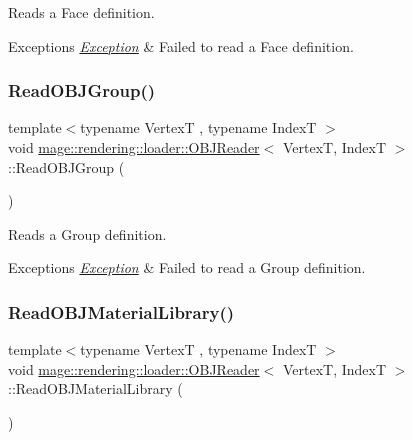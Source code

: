 Reads a Face definition.


\begin{DoxyExceptions}{Exceptions}
{\em \mbox{\hyperlink{classmage_1_1_exception}{Exception}}} & Failed to read a Face definition. \\
\hline
\end{DoxyExceptions}
\mbox{\label{classmage_1_1rendering_1_1loader_1_1_o_b_j_reader_a4e733a0afea4b82e3aea89fe58f5bfba}} 
\subsubsection{\texorpdfstring{Read\+O\+B\+J\+Group()}{ReadOBJGroup()}}
{\footnotesize\ttfamily template$<$typename VertexT , typename IndexT $>$ \\
void \mbox{\hyperlink{classmage_1_1rendering_1_1loader_1_1_o_b_j_reader}{mage\+::rendering\+::loader\+::\+O\+B\+J\+Reader}}$<$ VertexT, IndexT $>$\+::Read\+O\+B\+J\+Group (\begin{DoxyParamCaption}{ }\end{DoxyParamCaption})\hspace{0.3cm}{\ttfamily [private]}}

Reads a Group definition.


\begin{DoxyExceptions}{Exceptions}
{\em \mbox{\hyperlink{classmage_1_1_exception}{Exception}}} & Failed to read a Group definition. \\
\hline
\end{DoxyExceptions}
\mbox{\label{classmage_1_1rendering_1_1loader_1_1_o_b_j_reader_aa898eb5cac6a5e04b1da9329587a81cd}} 
\subsubsection{\texorpdfstring{Read\+O\+B\+J\+Material\+Library()}{ReadOBJMaterialLibrary()}}
{\footnotesize\ttfamily template$<$typename VertexT , typename IndexT $>$ \\
void \mbox{\hyperlink{classmage_1_1rendering_1_1loader_1_1_o_b_j_reader}{mage\+::rendering\+::loader\+::\+O\+B\+J\+Reader}}$<$ VertexT, IndexT $>$\+::Read\+O\+B\+J\+Material\+Library (\begin{DoxyParamCaption}{ }\end{DoxyParamCaption})\hspace{0.3cm}{\ttfamily [private]}}

